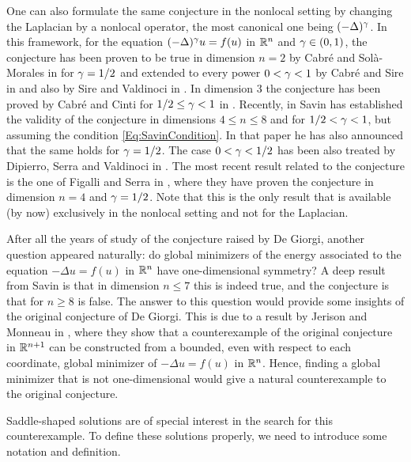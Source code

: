 One can also formulate the same conjecture in the nonlocal setting by changing the Laplacian by a nonlocal operator, the most canonical one being $(-\Delta)^\gamma$. In this framework, for the equation $(-\Delta)^\gamma u = f(u)$ in $\mathbb{R}^n$ and $\gamma\in (0,1)$, the conjecture has been proven to be true in dimension $n=2$ by Cabré and Solà-Morales in \cite{CabreSolaMorales} for $\gamma=1/2$ and extended to every power $0<\gamma<1$ by Cabré and Sire in \cite{CabreSireI} and also by Sire and Valdinoci in \cite{SireValdinoci}. In dimension $3$ the conjecture has been proved by Cabré and Cinti for $1/2 \leq \gamma < 1$ in \cite{CabreCinti-EnergyHalfL, CabreCinti-SharpEnergy}. Recently, in \cite{Savin-Fractional} Savin has established the validity of the conjecture in dimensions $4\leq n \leq 8$ and for $1/2 < \gamma < 1$, but assuming the condition \eqref{Eq:SavinCondition}. In that paper he has also announced that the same holds for $\gamma=1/2$. The case $0<\gamma<1/2$ has been also treated by Dipierro, Serra and Valdinoci in \cite{DipierroSerraValdinoci} . The most recent result related to the conjecture is the one of Figalli and Serra in \cite{FigalliSerra}, where they have proven the conjecture in dimension $n=4$ and $\gamma=1/2$. Note that this is the only result that is available (by now) exclusively in the nonlocal setting and not for the Laplacian.

After all the years of study of the conjecture raised by De Giorgi, another question appeared naturally: do global minimizers of the energy associated to the equation  $-\Delta u = f(u)$ in $\mathbb{R}^n$ have one-dimensional symmetry? A deep result from Savin \cite{Savin-DeGiorgi} is that in dimension $n \leq 7$ this is indeed true, and the conjecture is that for $n\geq 8$ is false. The answer to this question would provide some insights of the original conjecture of De Giorgi. This is due to a result by Jerison and Monneau in \cite{JerisonMonneau}, where they show that a counterexample of the original conjecture in $\mathbb{R}^{n+1}$ can be constructed from a bounded, even with respect to each coordinate, global minimizer of $-\Delta u = f(u)$ in $\mathbb{R}^n$. Hence, finding a global minimizer that is not one-dimensional would give a natural counterexample to the original conjecture.

Saddle-shaped solutions are of special interest in the search for this counterexample. To define these solutions properly, we need to introduce some notation and definition.

